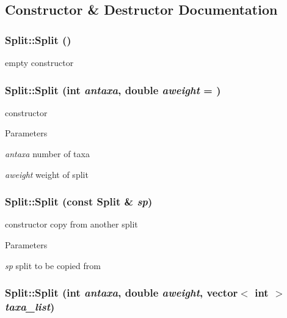 \subsection{Constructor \& Destructor Documentation}
\hypertarget{classSplit_a365a552fc4d3a0599c50ef629a691be4}{
\subsubsection[{Split}]{\setlength{\rightskip}{0pt plus 5cm}Split::Split ()}}
\label{classSplit_a365a552fc4d3a0599c50ef629a691be4}
empty constructor \hypertarget{classSplit_a94a33c0e8cfb74c40df1839c1a0bd843}{
\subsubsection[{Split}]{\setlength{\rightskip}{0pt plus 5cm}Split::Split (int {\em antaxa}, \/  double {\em aweight} = {})}}
\label{classSplit_a94a33c0e8cfb74c40df1839c1a0bd843}
constructor 
\begin{DoxyParams}{Parameters}
\item[{\em antaxa}]number of taxa \item[{\em aweight}]weight of split \end{DoxyParams}
\hypertarget{classSplit_ad98691b8ee7de01dc6bb66eb5937f0ce}{
\subsubsection[{Split}]{\setlength{\rightskip}{0pt plus 5cm}Split::Split (const {\bf Split} \& {\em sp})}}
\label{classSplit_ad98691b8ee7de01dc6bb66eb5937f0ce}
constructor copy from another split 
\begin{DoxyParams}{Parameters}
\item[{\em sp}]split to be copied from \end{DoxyParams}
\hypertarget{classSplit_a9ef1d15c79111653ea9f2af81327630a}{
\subsubsection[{Split}]{\setlength{\rightskip}{0pt plus 5cm}Split::Split (int {\em antaxa}, \/  double {\em aweight}, \/  vector$<$ int $>$ {\em taxa\_\-list})}}
\label{classSplit_a9ef1d15c79111653ea9f2af81327630a}
